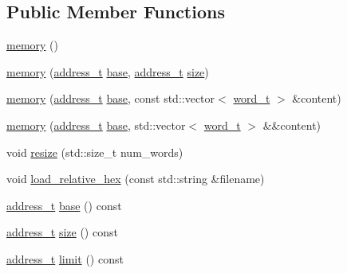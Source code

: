\subsection*{Public Member Functions}
\begin{DoxyCompactItemize}
\item 
\hyperlink{classllk_1_1memory_a7069a8b6f6ef11b17f2346db9d943204}{memory} ()
\item 
\hyperlink{classllk_1_1memory_a3b2eedc557f34c00cb0a7bc677e1cb5a}{memory} (\hyperlink{classllk_1_1memory_ae7a4b897aa999f22e250dc8e4d773dec}{address\+\_\+t} \hyperlink{classllk_1_1memory_aa31d9d8c64a1b4f7d8dbeec82af0add2}{base}, \hyperlink{classllk_1_1memory_ae7a4b897aa999f22e250dc8e4d773dec}{address\+\_\+t} \hyperlink{classllk_1_1memory_aee316fd12fa52ea8b9884a03f67a8768}{size})
\item 
\hyperlink{classllk_1_1memory_ace253b499ac7e10d49b7e58ded343884}{memory} (\hyperlink{classllk_1_1memory_ae7a4b897aa999f22e250dc8e4d773dec}{address\+\_\+t} \hyperlink{classllk_1_1memory_aa31d9d8c64a1b4f7d8dbeec82af0add2}{base}, const std\+::vector$<$ \hyperlink{classllk_1_1memory_a432a6c0ae1bcb9c44d79cfa1a239419c}{word\+\_\+t} $>$ \&content)
\item 
\hyperlink{classllk_1_1memory_aafdc3d1f68de49e73d640b44fe9e1628}{memory} (\hyperlink{classllk_1_1memory_ae7a4b897aa999f22e250dc8e4d773dec}{address\+\_\+t} \hyperlink{classllk_1_1memory_aa31d9d8c64a1b4f7d8dbeec82af0add2}{base}, std\+::vector$<$ \hyperlink{classllk_1_1memory_a432a6c0ae1bcb9c44d79cfa1a239419c}{word\+\_\+t} $>$ \&\&content)
\item 
void \hyperlink{classllk_1_1memory_aaaa33a11f4fcd7d45f4689ef8e5ccb04}{resize} (std\+::size\+\_\+t num\+\_\+words)
\item 
void \hyperlink{classllk_1_1memory_a584700cdc818d0dad9e44a122f14997b}{load\+\_\+relative\+\_\+hex} (const std\+::string \&filename)
\item 
\hyperlink{classllk_1_1memory_ae7a4b897aa999f22e250dc8e4d773dec}{address\+\_\+t} \hyperlink{classllk_1_1memory_aa31d9d8c64a1b4f7d8dbeec82af0add2}{base} () const
\item 
\hyperlink{classllk_1_1memory_ae7a4b897aa999f22e250dc8e4d773dec}{address\+\_\+t} \hyperlink{classllk_1_1memory_aee316fd12fa52ea8b9884a03f67a8768}{size} () const
\item 
\hyperlink{classllk_1_1memory_ae7a4b897aa999f22e250dc8e4d773dec}{address\+\_\+t} \hyperlink{classllk_1_1memory_a81eb269512a86baf7e9cd560e44e0d41}{limit} () const
\item 

\end{DoxyCompactItemize}
